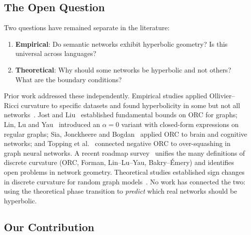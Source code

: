 \documentclass[11pt,a4paper]{article}
\begin{document}
\subsection{The Open Question}

Two questions have remained separate in the literature:
\begin{enumerate}
    \item \textbf{Empirical}: Do semantic networks exhibit hyperbolic geometry? Is this universal across languages?
    \item \textbf{Theoretical}: Why should some networks be hyperbolic and not others? What are the boundary conditions?
\end{enumerate}

Prior work addressed these independently. Empirical studies applied Ollivier--Ricci curvature to specific datasets and found hyperbolicity in some but not all networks~\cite{ni2015ricci,sandhu2015graph}. Jost and Liu~\cite{jost2014ollivier} established fundamental bounds on ORC for graphs; Lin, Lu and Yau~\cite{lin2011ricci} introduced an $\alpha=0$ variant with closed-form expressions on regular graphs; Sia, Jonckheere and Bogdan~\cite{sia2021forman} applied ORC to brain and cognitive networks; and Topping et al.~\cite{topping2022over} connected negative ORC to over-squashing in graph neural networks. A recent roadmap survey~\cite{samal2025roadmap} unifies the many definitions of discrete curvature (ORC, Forman, Lin--Lu--Yau, Bakry--\'Emery) and identifies open problems in network geometry. Theoretical studies established sign changes in discrete curvature for random graph models~\cite{mitsche2024curvature}. No work has connected the two: using the theoretical phase transition to \emph{predict} which real networks should be hyperbolic.

\subsection{Our Contribution}
\end{document}

